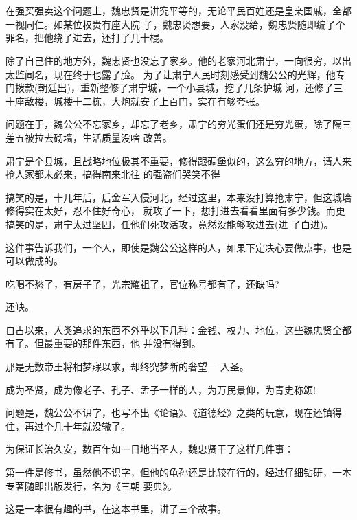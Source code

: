 \documentclass[11pt,a4paper,onecolumn]{article}
\begin{document}
\section[\thesection]{}

在强买强卖这个问题上，魏忠贤是讲究平等的，无论平民百姓还是皇亲国戚，全都一视同仁。如某位权贵有座大院
子，魏忠贤想要，人家没给，魏忠贤随即编了个罪名，把他绕了进去，还打了几十棍。

除了自己住的地方外，魏忠贤也没忘了家乡。他的老家河北肃宁，一向很穷，以出太监闻名，现在终于也露了脸。
为了让肃宁人民时刻感受到魏公公的光辉，他专门拨款(朝廷出)，重新整修了肃宁城，一个小县城，挖了几条护城
河，还修了三十座敌楼，城楼十二栋，大炮就安了上百门，实在有够夸张。

问题在于，魏公公不忘家乡，却忘了老乡，肃宁的穷光蛋们还是穷光蛋，除了隔三差五被拉去砌墙，生活质量没啥
改善。

肃宁是个县城，且战略地位极其不重要，修得跟碉堡似的，这么穷的地方，请人来抢人家都未必来，搞得南来北往
的强盗们哭笑不得

搞笑的是，十几年后，后金军入侵河北，经过这里，本来没打算抢肃宁，但这城墙修得实在太好，忍不住好奇心，
就攻了一下，想打进去看看里面有多少钱。而更搞笑的是，肃宁太过坚固，任他们死攻活攻，竟然没能够攻进去(进
了白进)。

这件事告诉我们，一个人，即使是魏公公这样的人，如果下定决心要做点事，也是可以做成的。

吃喝不愁了，有房子了，光宗耀祖了，官位称号都有了，还缺吗?

还缺。

自古以来，人类追求的东西不外乎以下几种：金钱、权力、地位，这些魏忠贤全都有了。但最重要的那件东西，他
并没有得到。

那是无数帝王将相梦寐以求，却终究梦断的奢望----入圣。

成为圣贤，成为像老子、孔子、孟子一样的人，为万民景仰，为青史称颂!

问题是，魏公公不识字，也写不出《论语》、《道德经》之类的玩意，现在还镇得住，再过个几十年就没辙了。

为保证长治久安，数百年如一日地当圣人，魏忠贤干了这样几件事：

第一件是修书，虽然他不识字，但他的龟孙还是比较在行的，经过仔细钻研，一本专著随即出版发行，名为《三朝
要典》。

这是一本很有趣的书，在这本书里，讲了三个故事。

\section[\thesection]{}
\end{document}
